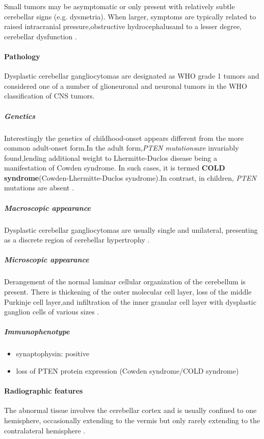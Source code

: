 Small tumors may be asymptomatic or only present with relatively subtle cerebellar signs (e.g. dysmetria). When larger, symptoms are typically related to raised intracranial pressure,obstructive hydrocephalusand to a lesser degree, cerebellar dysfunction .


\paragraph{Pathology}

Dysplastic cerebellar gangliocytomas are designated as WHO grade 1 tumors and considered one of a number of glioneuronal and neuronal tumors in the WHO classification of CNS tumors.

\subparagraph{Genetics}

Interestingly the genetics of childhood-onset appears different from the more common adult-onset form.In the adult form,\emph{PTEN mutations}are invariably found,lending additional weight to Lhermitte-Duclos disease being a manifestation of Cowden syndrome. In such cases, it is termed \textbf{COLD syndrome}(Cowden-Lhermitte-Duclos syndrome).In contrast, in children, \emph{PTEN} mutations are absent .

\subparagraph{Macroscopic appearance}

Dysplastic cerebellar gangliocytomas are usually single and unilateral, presenting as a discrete region of cerebellar hypertrophy .

\subparagraph{Microscopic appearance}

Derangement of the normal laminar cellular organization of the cerebellum is present. There is thickening of the outer molecular cell layer, loss of the middle Purkinje cell layer,and infiltration of the inner granular cell layer with dysplastic ganglion cells of various sizes .

\subparagraph{Immunophenotype}

\begin{itemize}
	\item
	synaptophysin: positive
	\item
	loss of PTEN protein expression (Cowden syndrome/COLD syndrome)
\end{itemize}

\paragraph{Radiographic features}

The abnormal tissue involves the cerebellar cortex and is usually confined to one hemisphere, occasionally extending to the vermis but only rarely extending to the contralateral hemisphere .

